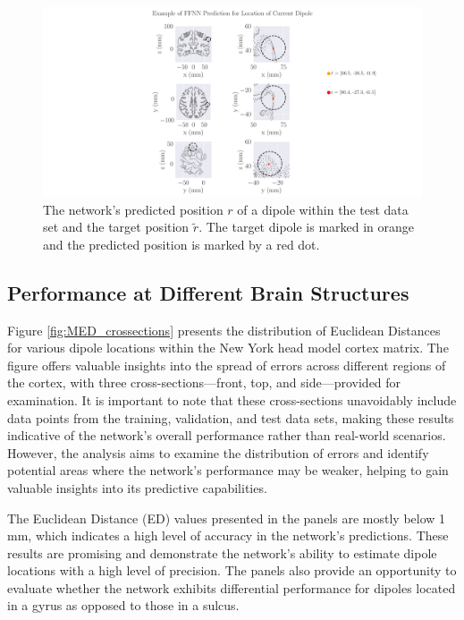 \documentclass[a4paper, UKenglish, 11pt]{uiomaster}
\begin{document}
\begin{figure}
  \hspace*{-6cm}
  \includegraphics[width=23cm]{figures/FFNN_single_dipole_prediction.pdf}
  \caption{The network's predicted position $r$ of a dipole within the test data set and the target position $\tilde{r}$. The target dipole is marked in orange and the predicted position is marked by a red dot.}
  \label{fig:prediction_FCNN_example}
\end{figure}

\subsection{Performance at Different Brain Structures}

Figure \ref{fig:MED_crossections} presents the distribution of Euclidean Distances for various dipole locations within the New York head model cortex matrix. The figure offers valuable insights into the spread of errors across different regions of the cortex, with three cross-sections—front, top, and side—provided for examination. It is important to note that these cross-sections unavoidably include data points from the training, validation, and test data sets, making these results indicative of the network's overall performance rather than real-world scenarios. However, the analysis aims to examine the distribution of errors and identify potential areas where the network's performance may be weaker, helping to gain valuable insights into its predictive capabilities.

The Euclidean Distance (ED) values presented in the panels are mostly below 1 mm, which indicates a high level of accuracy in the network's predictions. These results are promising and demonstrate the network's ability to estimate dipole locations with a high level of precision. The panels also provide an opportunity to evaluate whether the network exhibits differential performance for dipoles located in a gyrus as opposed to those in a sulcus.
\end{document}
